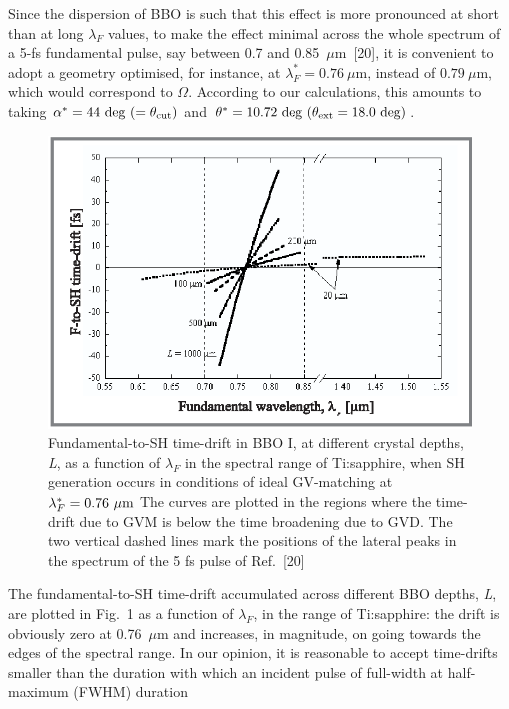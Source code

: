\documentclass[times]{jtitauth}
\begin{document}
Since the dispersion of BBO is such that this effect is more
pronounced  at short than at long $\lambda_F$ values, to make the
effect minimal across the whole spectrum of a 5-fs fundamental
pulse, say between 0.7 and 0.85~$\mu$m~[20], it is convenient to
adopt a geometry optimised, for instance, at $\lambda_F^* =
0.76~\mu$m, instead of $0.79~\mu$m, which would correspond to
$\Omega$. According to our calculations, this amounts to taking
$\alpha^* = 44~{\rm deg}~(= \theta_{\rm cut})$ and $\theta^* =
10.72~{\rm deg}~(\theta_{\rm ext} = 18.0~{\rm deg})$.

\begin{figure}[!hbp]
\includegraphics{fig}
\caption{Fundamental-to-SH time-drift in BBO I, at different
crystal depths, {\it L}, as a function of $\lambda_F$ in the
spectral range of Ti:sapphire, when SH generation occurs in
conditions of ideal GV-matching at $\lambda_F^* = 0.76~\mu{\rm m}$
\hfill\break The curves are plotted in the regions where the time-drift due
to GVM is below the  time broadening due to GVD. The two vertical
dashed lines mark the positions of the lateral peaks in the
spectrum of the 5 fs pulse of Ref.~[20]}
\end{figure}
The fundamental-to-SH time-drift accumulated across different
BBO depths, {\it L}, are plotted in Fig.~1 as a function of
$\lambda_F$, in the range of Ti:sapphire: the drift is obviously
zero at 0.76~$\mu$m and increases, in magnitude, on going towards
the edges of the spectral range. In our opinion, it is reasonable
to accept time-drifts smaller than the duration with which an
incident pulse of full-width at half-maximum (FWHM) duration
\end{document}

